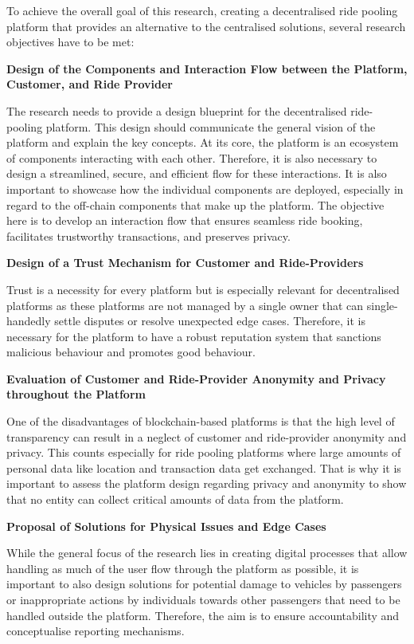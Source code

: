To achieve the overall goal of this research, creating a decentralised ride pooling platform that provides an alternative to the centralised solutions, several research objectives have to be met:

\textbf{Design of the Components and Interaction Flow between the Platform, Customer, and Ride Provider}

The research needs to provide a design blueprint for the decentralised ride-pooling platform. This design should communicate the general vision of the platform and explain the key concepts.
At its core, the platform is an ecosystem of components interacting with each other. 
Therefore, it is also necessary to design a streamlined, secure, and efficient flow for these interactions. It is also important to showcase how the individual components are deployed, especially in regard to the off-chain components that make up the platform. The objective here is to develop an interaction flow that ensures seamless ride booking, facilitates trustworthy transactions, and preserves privacy.


\textbf{Design of a Trust Mechanism for Customer and Ride-Providers}

Trust is a necessity for every platform but is especially relevant for decentralised platforms as these platforms are not managed by a single owner that can single-handedly  settle disputes or resolve unexpected edge cases. Therefore, it is necessary for the platform to have a robust reputation system that sanctions malicious behaviour and promotes  good behaviour.


\textbf{Evaluation of Customer and Ride-Provider Anonymity and Privacy throughout the Platform}

One of the disadvantages of blockchain-based platforms is that the high level of transparency can result in a neglect of customer and ride-provider anonymity and privacy. This counts especially for ride pooling platforms where large amounts of personal data like location and transaction data get exchanged. That is why it is important to assess the platform design regarding privacy and anonymity to show that no entity can collect critical amounts of data from the platform.

\newpage
\textbf{Proposal of Solutions for Physical Issues and Edge Cases}

While the general focus of the research lies in creating digital processes that allow handling as much of the user flow through the platform as possible, it is important to also design solutions for  potential damage to vehicles by passengers or inappropriate actions by individuals towards other passengers that need to be handled outside the platform. Therefore, the aim is to ensure accountability and conceptualise reporting mechanisms.

